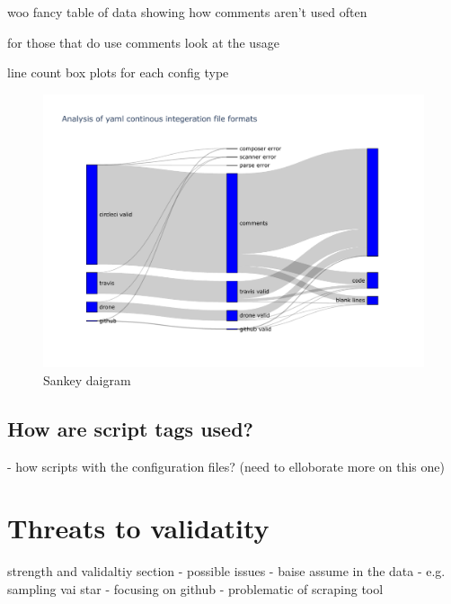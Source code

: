 \documentclass[twoside,12pt,titlepage,a4paper]{article}
\begin{document}


woo fancy table of data showing how comments aren't used often

for those that do use comments look at the usage

line count box plots for each config type

\begin{figure}[h]
  \centering
  \includegraphics[width=\textwidth]{../src/results/sankey.pdf}
  \caption[alt text]{Sankey daigram}
\end{figure}


\vspace*{-0.05in}
\subsection{How are script tags used?}
\vspace*{-0.05in}

- how scripts with the configuration files? (need to elloborate more on this one)

\section{Threats to validatity}

strength and validaltiy section 
- possible issues
- baise assume in the data
	 - e.g. sampling vai star
- focusing on github
- problematic of scraping tool
\end{document}

